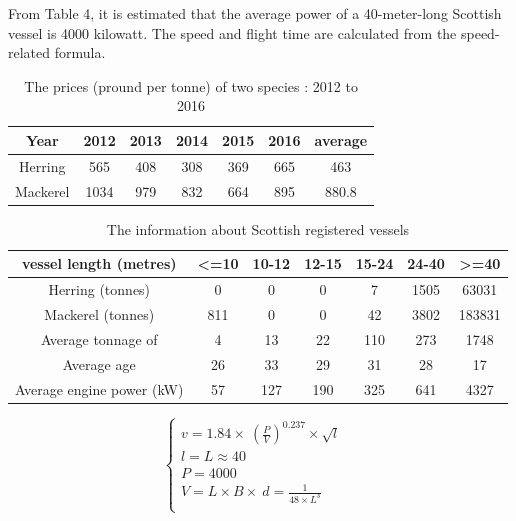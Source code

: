 \documentclass{mcmthesis}
\begin{document}
From Table 4, it is estimated that the average power of a 40-meter-long Scottish vessel is 4000 kilowatt. The speed and flight time are calculated from the speed-related formula.



\begin{table}[!htb]
\centering
\setlength{\abovecaptionskip}{0pt}%
\setlength{\belowcaptionskip}{13pt}%
\caption{The prices (pround  per tonne) of two species : 2012 to 2016}
\begin{tabular}{ccccccc}
\toprule[1.5pt]
Year&2012&2013&2014&2015&2016&average\\
\bottomrule[1.5pt]
Herring &565&408&308&369&665&463\\
Mackerel &1034&979&832&664&895&880.8\\
\bottomrule[1.5pt]
\end{tabular}
\end{table}


\begin{table}[!htb]
\centering
\setlength{\abovecaptionskip}{0pt}%
\setlength{\belowcaptionskip}{13pt}%
\caption{The information about Scottish registered vessels}
\begin{tabular}{ccccccc}
\toprule[1.5pt]
vessel length (metres)&<=10&10-12&12-15&15-24&24-40&>=40\\
\bottomrule[1.5pt]
Herring (tonnes)&0&0&0&7&1505&63031\\
Mackerel (tonnes) &811&0&0&42&3802&183831\\
Average tonnage of &4&13&22&110&273&1748\\
Average age&26&33&29&31&28&17\\
Average engine power (kW)&57&127&190&325&641&4327\\

\bottomrule[1.5pt]
\end{tabular}
\end{table}



\begin{equation}
\left\{
\begin{array}{lr}
v=1.84\times \ (\frac{P}{V}) ^{0.237} \times \sqrt{l} &\\
l=L\approx 40 &\\
P=4000&\\
V=L\times B\times\ d =\frac{1}{48\times L^3}\\
\end{array}
\right.
\end{equation}
\end{document}
